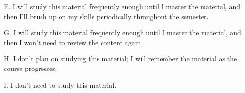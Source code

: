 \documentclass{ximera}
\begin{document}
\begin{question}
\begin{question}
\end{question}
\begin{question}
    
    F. I will study this material frequently enough until I master the material, and then I'll brush up on my skills periodically throughout the semester. 

    \begin{multipleChoice}
    \end{multipleChoice}
    
\end{question}
\begin{question}
    
    G. I will study this material frequently enough until I master the material, and then I won't need to review the content again. 

    \begin{multipleChoice}
    \end{multipleChoice}
    
\end{question}
\begin{question}
    
    H. I don't plan on studying this material; I will remember the material as the course progresses. 

    \begin{multipleChoice}
    \end{multipleChoice}
    
\end{question}
\begin{question}
    
    I. I don't need to study this material. 

    \begin{multipleChoice}
    \end{multipleChoice}
    
\end{question}

\end{question}




%
\end{document}
